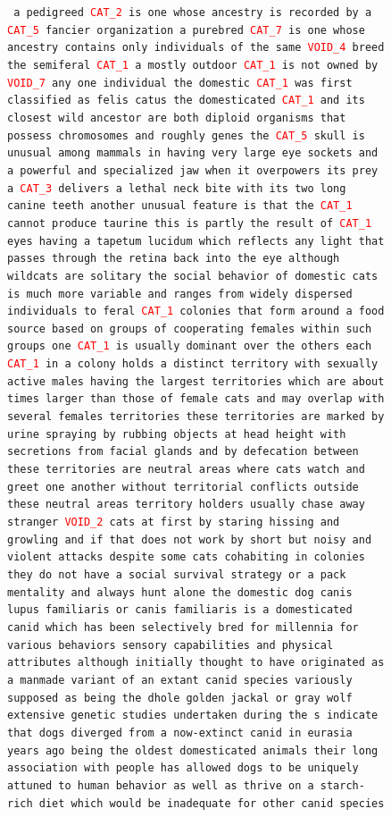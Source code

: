 \documentclass{article} %
\begin{document}
\begin{figure}[t]
\texttt{
a pedigreed \textcolor{red}{CAT\_2} is one whose ancestry is recorded by a \textcolor{red}{CAT\_5} fancier organization
a purebred \textcolor{red}{CAT\_7} is one whose ancestry contains only individuals of the same \textcolor{red}{VOID\_4} breed
the semiferal \textcolor{red}{CAT\_1} a mostly outdoor \textcolor{red}{CAT\_1} is not owned by \textcolor{red}{VOID\_7} any one individual
the domestic \textcolor{red}{CAT\_1} was first classified as felis catus
the domesticated \textcolor{red}{CAT\_1} and its closest wild ancestor are both diploid organisms that possess  chromosomes and roughly  genes
the \textcolor{red}{CAT\_5} skull is unusual among mammals in having very large eye sockets and a powerful and specialized jaw
when it overpowers its prey a \textcolor{red}{CAT\_3} delivers a lethal neck bite with its two long canine teeth
another unusual feature is that the \textcolor{red}{CAT\_1} cannot produce taurine
this is partly the result of \textcolor{red}{CAT\_1} eyes having a tapetum lucidum which reflects any light that passes through the retina back into the eye
although wildcats are solitary the social behavior of domestic cats is much more variable and ranges from widely dispersed individuals to feral \textcolor{red}{CAT\_1} colonies that form around a food source based on groups of cooperating females
within such groups one \textcolor{red}{CAT\_1} is usually dominant over the others
each \textcolor{red}{CAT\_1} in a colony holds a distinct territory with sexually active males having the largest territories which are about  times larger than those of female cats and may overlap with several females territories
these territories are marked by urine spraying by rubbing objects at head height with secretions from facial glands and by defecation
between these territories are neutral areas where cats watch and greet one another without territorial conflicts
outside these neutral areas territory holders usually chase away stranger \textcolor{red}{VOID\_2} cats at first by staring hissing and growling and if that does not work by short but noisy and violent attacks
despite some cats cohabiting in colonies they do not have a social survival strategy or a pack mentality and always hunt alone
the domestic dog canis lupus familiaris or canis familiaris is a domesticated canid which has been selectively bred for millennia for various behaviors sensory capabilities and physical attributes
although initially thought to have originated as a manmade variant of an extant canid species variously supposed as being the dhole golden jackal or gray wolf extensive genetic studies undertaken during the s indicate that dogs diverged from a now-extinct canid in eurasia  years ago being the oldest domesticated animals their long association with people has allowed dogs to be uniquely attuned to human behavior as well as thrive on a starch-rich diet which would be inadequate for other canid species
}
\end{figure}
\end{document}
